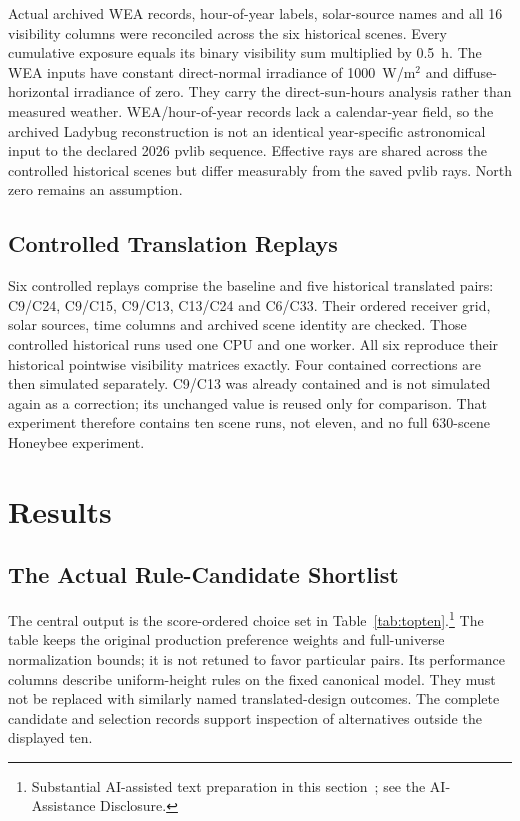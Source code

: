\documentclass{llncs}
\newcommand{\aidraft}{\footnote{Substantial AI-assisted text preparation in this section~\cite{openai2026}; see the AI-Assistance Disclosure.}}
\begin{document}
Actual archived WEA records, hour-of-year labels, solar-source names and all 16 visibility columns were reconciled across the six historical scenes. Every cumulative exposure equals its binary visibility sum multiplied by 0.5~h. The WEA inputs have constant direct-normal irradiance of 1000~W/m$^2$ and diffuse-horizontal irradiance of zero. They carry the direct-sun-hours analysis rather than measured weather. WEA/hour-of-year records lack a calendar-year field, so the archived Ladybug reconstruction is not an identical year-specific astronomical input to the declared 2026 pvlib sequence. Effective rays are shared across the controlled historical scenes but differ measurably from the saved pvlib rays. North zero remains an assumption.

\subsection{Controlled Translation Replays}
Six controlled replays comprise the baseline and five historical translated pairs: C9/C24, C9/C15, C9/C13, C13/C24 and C6/C33. Their ordered receiver grid, solar sources, time columns and archived scene identity are checked. Those controlled historical runs used one CPU and one worker. All six reproduce their historical pointwise visibility matrices exactly. Four contained corrections are then simulated separately. C9/C13 was already contained and is not simulated again as a correction; its unchanged value is reused only for comparison. That experiment therefore contains ten scene runs, not eleven, and no full 630-scene Honeybee experiment.

\section{Results}
\subsection{The Actual Rule-Candidate Shortlist}
The central output is the score-ordered choice set in Table~\ref{tab:topten}.\aidraft{} The table keeps the original production preference weights and full-universe normalization bounds; it is not retuned to favor particular pairs. Its performance columns describe uniform-height rules on the fixed canonical model. They must not be replaced with similarly named translated-design outcomes. The complete candidate and selection records support inspection of alternatives outside the displayed ten.
\end{document}
